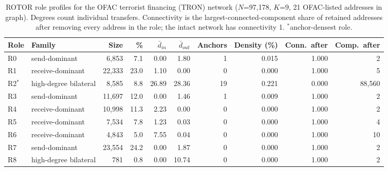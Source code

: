 \begin{table}[htbp]
\centering
\caption{ROTOR role profiles for the OFAC terrorist financing (TRON) network ($N$=97,178, $K$=9, 21 OFAC-listed addresses in graph). Degrees count individual transfers. Connectivity is the largest-connected-component share of retained addresses after removing every address in the role; the intact network has connectivity 1. $^*$anchor-densest role.}
\label{tab:ofac-tf-roles}
\small
\begin{tabular}{llrrrrrrrr}
\toprule
\textbf{Role} & \textbf{Family} & \textbf{Size} & \textbf{\%} & $\bar{d}_{in}$ & $\bar{d}_{out}$ & \textbf{Anchors} & \textbf{Density (\%)} & \textbf{Conn.\ after} & \textbf{Comp.\ after} \\
\midrule
R0 & send-dominant & 6,853 & 7.1 & 0.00 & 1.80 & 1 & 0.015 & 1.000 & 2 \\
R1 & receive-dominant & 22,333 & 23.0 & 1.10 & 0.00 & 0 & 0.000 & 1.000 & 5 \\
R2$^*$ & high-degree bilateral & 8,585 & 8.8 & 26.89 & 28.36 & 19 & 0.221 & 0.000 & 88,560 \\
R3 & send-dominant & 11,697 & 12.0 & 0.00 & 1.46 & 1 & 0.009 & 1.000 & 2 \\
R4 & receive-dominant & 10,998 & 11.3 & 2.23 & 0.00 & 0 & 0.000 & 1.000 & 2 \\
R5 & receive-dominant & 7,534 & 7.8 & 1.23 & 0.03 & 0 & 0.000 & 1.000 & 4 \\
R6 & receive-dominant & 4,843 & 5.0 & 7.55 & 0.04 & 0 & 0.000 & 1.000 & 10 \\
R7 & send-dominant & 23,554 & 24.2 & 0.00 & 1.87 & 0 & 0.000 & 1.000 & 2 \\
R8 & high-degree bilateral & 781 & 0.8 & 0.00 & 10.74 & 0 & 0.000 & 1.000 & 2 \\
\bottomrule
\end{tabular}
\end{table}
